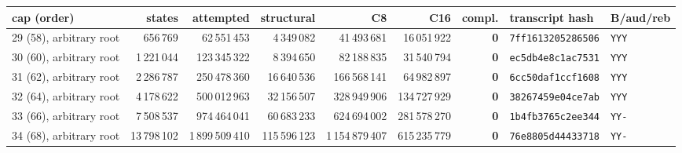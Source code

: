 \begin{tabular}{@{}lrrrrrrll@{}}
\toprule
cap (order) & states & attempted & structural & C8 & C16 & compl. & transcript hash & B/aud/reb \\ \midrule
29 (58), arbitrary root & 656\,769 & 62\,551\,453 & 4\,349\,082 & 41\,493\,681 & 16\,051\,922 & \textbf{0} & \texttt{7ff1613205286506} & \texttt{YYY} \\
30 (60), arbitrary root & 1\,221\,044 & 123\,345\,322 & 8\,394\,650 & 82\,188\,835 & 31\,540\,794 & \textbf{0} & \texttt{ec5db4e8c1ac7531} & \texttt{YYY} \\
31 (62), arbitrary root & 2\,286\,787 & 250\,478\,360 & 16\,640\,536 & 166\,568\,141 & 64\,982\,897 & \textbf{0} & \texttt{6cc50daf1ccf1608} & \texttt{YYY} \\
32 (64), arbitrary root & 4\,178\,622 & 500\,012\,963 & 32\,156\,507 & 328\,949\,906 & 134\,727\,929 & \textbf{0} & \texttt{38267459e04ce7ab} & \texttt{YYY} \\
33 (66), arbitrary root & 7\,508\,537 & 974\,464\,041 & 60\,683\,233 & 624\,694\,002 & 281\,578\,270 & \textbf{0} & \texttt{1b4fb3765c2ee344} & \texttt{YY-} \\
34 (68), arbitrary root & 13\,798\,102 & 1\,899\,509\,410 & 115\,596\,123 & 1\,154\,879\,407 & 615\,235\,779 & \textbf{0} & \texttt{76e8805d44433718} & \texttt{YY-} \\
\bottomrule
\end{tabular}
